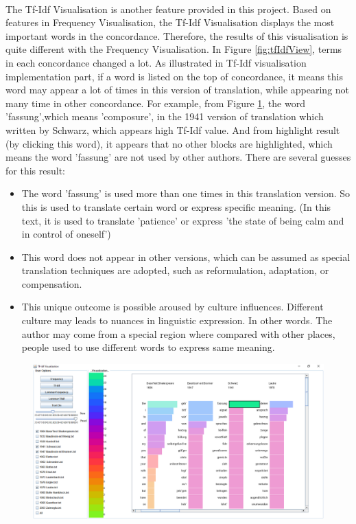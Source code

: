 \paragraph[]{}The Tf-Idf Visualisation is another feature provided in this project. Based on features in Frequency Visualisation, the Tf-Idf Visualisation displays the most important words in the concordance. Therefore, the results of this visualisation is quite different with the Frequency Visualisation. In Figure \ref{fig:tfIdfView}, terms in each concordance changed a lot. As illustrated in Tf-Idf visualisation implementation part, if a word is listed on the top of concordance, it means this word may appear a lot of times in this version of translation, while appearing not many time in other concordance. For example, from Figure \ref{fig:fassung}, the word 'fassung',which means 'composure', in the 1941 version of translation which written by Schwarz, which appears high Tf-Idf value. And from highlight result (by clicking this word), it appears that no other blocks are highlighted, which means the word 'fassung' are not used by other authors. There are several guesses for this result:
\begin{itemize} 	
	\item \textbf{} The word 'fassung' is used more than one times in this translation version. So this is used to translate certain word or express specific meaning. (In this text, it is used to translate 'patience' or express 'the state of being calm and in control of oneself')
	\item \textbf{} This word does not appear in other versions, which can be assumed as special translation techniques are adopted, such as reformulation, adaptation, or compensation. 
	\item \textbf{} This unique outcome is possible aroused by culture influences. Different culture may leads to nuances in linguistic expression. In other words. The author may come from a special region where compared with other places, people used to use different words to express same meaning.
\end{itemize} 

\begin{figure}[H]
	\centering	
	\includegraphics[scale=0.4]{Figs/Fassung}\\[1ex]
	\caption{}
	\label{fig:fassung}
\end{figure} 

